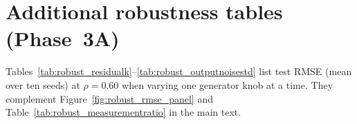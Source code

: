 \section{Additional robustness tables (Phase~3A)}
\label{sec:appendix_robust_tables}

Tables~\ref{tab:robust_residualk}--\ref{tab:robust_outputnoisestd} list test RMSE (mean over ten seeds) at $\rho=0.60$ when varying one generator knob at a time. They complement Figure~\ref{fig:robust_rmse_panel} and Table~\ref{tab:robust_measurementratio} in the main text.


